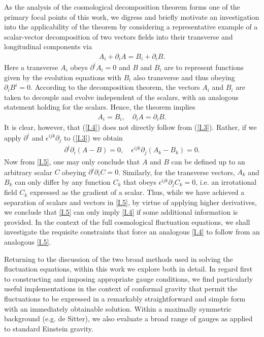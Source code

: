 As the analysis of the cosmological decomposition theorem forms one of the primary focal points of this work, we digress and briefly motivate an investigation into the applicability of the theorem by considering a representative example of a scalar-vector decomposition of two vectors fields into their transverse and longitudinal components via
%
\begin{eqnarray}
A_i+\partial_iA=B_i+\partial_iB.
\label{I.3}
\end{eqnarray}
%
Here a transverse $A_i$ obeys $\partial^i A_i = 0$ and $B$ and $B_i$ are to represent functions given by the evolution equations with $B_i$ also transverse and thus obeying $\partial_iB^i=0$. According to the decomposition theorem, the vectors $A_i$ and $B_i$ are taken to decouple and evolve independent of the scalars, with an analogous statement holding for the scalars. Hence, the theorem implies
%
\begin{eqnarray}
A_i= B_i,\quad \partial_iA=\partial_iB.
\label{I.4}
\end{eqnarray}
%
It is clear, however, that (\ref{I.4}) does not directly follow from (\ref{I.3}). Rather, if we apply $\partial^i$ and $\epsilon^{ijk}\partial_j$  to (\ref{I.3}) we obtain 
%
\begin{eqnarray}
\partial^i\partial_i(A-B)=0,\quad \epsilon^{ijk}\partial_j(A_k-B_k)=0.
\label{I.5}
\end{eqnarray}
%
Now from \eqref{I.5}, one may only conclude that $A$ and $B$ can be defined up to an arbitrary scalar $C$ obeying $\partial^i\partial_iC=0$. Similarly, for the transverse vectors, $A_k$ and $B_k$ can only differ by any function $C_k$ that obeys $\epsilon^{ijk}\partial_jC_k=0$, i.e. an irrotational field $C_k$ expressed as the gradient of a scalar. Thus, while we have achieved a separation of scalars and vectors in \eqref{I.5}, by virtue of applying higher derivatives, we conclude that \eqref{I.5} can only imply \eqref{I.4} if some additional information is provided. In the context of the full cosmological fluctuation equations, we shall investigate the requisite constraints that force an analogous \eqref{I.4} to follow from an analogous \eqref{I.5}. 

Returning to the discussion of the two broad methods used in solving the fluctuation equations, within this work we explore both in detail. In regard first to constructing and imposing appropriate gauge conditions, we find particularly useful implementations in the context of conformal gravity that permit the fluctuations to be expressed in a remarkably straightforward and simple form with an immediately obtainable solution. Within a maximally symmetric background (e.g. de Sitter), we also evaluate a broad range of gauges as applied to standard Einstein gravity.


